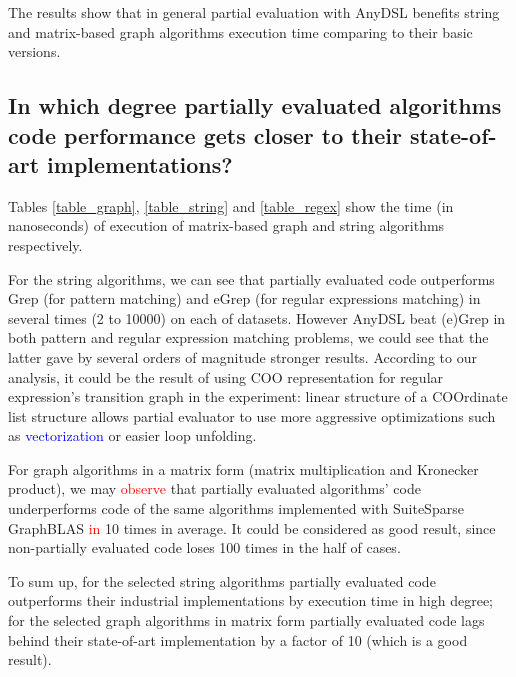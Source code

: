 \documentclass[conference]{IEEEtran}
\begin{document}
The results show that in general partial evaluation with AnyDSL benefits string and matrix-based graph algorithms execution time comparing to their basic versions.


\begin{figure}
	\centering
\end{figure}

\subsection{In which degree partially evaluated algorithms code performance gets closer to their state-of-art implementations?}

Tables \ref{table_graph}, \ref{table_string} and \ref{table_regex} show the time (in nanoseconds) of execution of matrix-based graph and string algorithms respectively. 

For the string algorithms, we can see that partially evaluated code outperforms Grep (for pattern matching) and eGrep (for regular expressions matching) in several times (2 to 10000) on each of datasets. However AnyDSL beat (e)Grep in both pattern and regular expression matching problems, we could see that the latter gave by several orders of magnitude stronger results. According to our analysis, it could be the result of using COO representation for regular expression's transition graph in the experiment: linear structure of a COOrdinate list structure allows partial evaluator to use more aggressive optimizations such as \textcolor{blue}{vectorization} or easier loop unfolding.

For graph algorithms in a matrix form (matrix multiplication and Kronecker product), we may \textcolor{red}{observe} that partially evaluated algorithms' code underperforms code of the same algorithms implemented with SuiteSparse GraphBLAS \textcolor{red}{in} 10 times in average. It could be considered as good result, since non-partially evaluated code loses 100 times in the half of cases.

To sum up, for the selected string algorithms partially evaluated code outperforms their industrial implementations by execution time in high degree; for the selected graph algorithms in matrix form partially evaluated code lags behind their state-of-art implementation by a factor of 10 (which is a good result).
\end{document}
